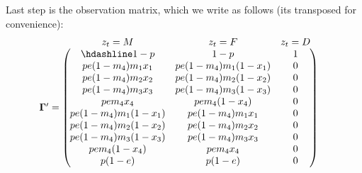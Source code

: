 \documentclass[
  12pt,
]{krantz}
\begin{document}
Last step is the observation matrix, which we write as follows (its transposed for convenience):
\[\begin{matrix}
& \\
\mathbf{\Gamma'} =
  \left ( \vphantom{ \begin{matrix} 12 \\ 12 \\ 12 \\ 12 \\ 12 \\ 12 \\ 12 \\ 12 \\ 12 \\ 12 \end{matrix} } \right .
          \end{matrix}
          \hspace{-1.2em}
          \begin{matrix}
          z_t=M & z_t=F & z_t=D \\ \hdashline
          1 - p  & 1 - p & 1\\
          p e (1-m_4) m_1 x_1 & p e (1-m_4) m_1 (1-x_1) & 0\\
          p e (1-m_4) m_2 x_2 & p e (1-m_4) m_2 (1-x_2) & 0\\
          p e (1-m_4) m_3 x_3 & p e (1-m_4) m_3 (1-x_3) & 0\\
          p e m_4 x_4 & p e m_4 (1-x_4) & 0\\
          p e (1-m_4) m_1 (1-x_1) & p e (1-m_4) m_1 x_1 & 0\\
          p e (1-m_4) m_2 (1-x_2) & p e (1-m_4) m_2 x_2 & 0\\
          p e (1-m_4) m_3 (1-x_3) & p e (1-m_4) m_3 x_3 & 0\\
          p e m_4 (1-x_4) & p e m_4 x_4 & 0\\
          p (1-e) & p (1-e) & 0\\
          \end{matrix}
          \hspace{-0.2em}
          \begin{matrix}
          & \\
          \left . \vphantom{ \begin{matrix} 12 \\ 12 \\ 12 \\ 12 \\ 12 \\ 12 \\ 12 \\ 12 \\ 12 \\ 12\end{matrix} } \right )

\end{matrix}\]
\end{document}
